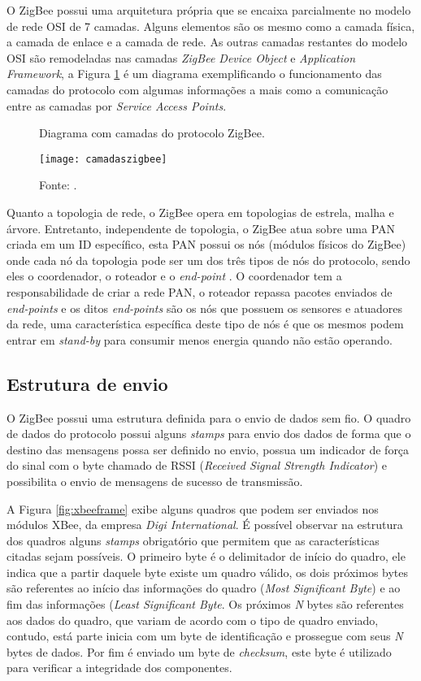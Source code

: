 O ZigBee possui uma arquitetura própria que se encaixa parcialmente no modelo de rede OSI de 7 camadas\cite{gislason2008zigbee}. Alguns elementos são os mesmo como a camada física, a camada de enlace e a camada de rede. As outras camadas restantes do modelo OSI são remodeladas nas camadas \textit{ZigBee Device Object} e \textit{Application Framework}, a Figura \ref{fig:camadaszigbee} é um diagrama exemplificando o funcionamento das camadas do protocolo com algumas informações a mais como a comunicação entre as camadas por \textit{Service Access Points}.


\begin{figure}[!htb]
	\centering
		\caption{Diagrama com camadas do protocolo ZigBee.}
		\texttt{[image: camadaszigbee]} 
		\caption*{Fonte: \cite{gislason2008zigbee}.}
		\label{fig:camadaszigbee}
\end{figure} 

Quanto a topologia de rede, o ZigBee opera em topologias de estrela, malha e árvore. Entretanto, independente de topologia, o ZigBee atua sobre uma PAN criada em um ID específico, esta PAN possui os nós (módulos físicos do ZigBee) onde cada nó da topologia pode ser um dos três tipos de nós do protocolo, sendo eles o coordenador, o roteador e o \textit{end-point} \cite{elahi2009zigbee}. O coordenador tem a responsabilidade de criar a rede PAN, o roteador repassa pacotes enviados de \textit{end-points} e os ditos \textit{end-points} são os nós que possuem os sensores e atuadores da rede, uma característica específica deste tipo de nós é que os mesmos podem entrar em \textit{stand-by} para consumir menos energia quando não estão operando.    

\subsection{Estrutura de envio}
O ZigBee possui uma estrutura definida para o envio de dados sem fio. O quadro de dados do protocolo possui alguns \textit{stamps} para envio dos dados de forma que o destino das mensagens possa ser definido no envio, possua um indicador de força do sinal com o byte chamado de RSSI (\textit{Received Signal Strength Indicator}) e possibilita o envio de mensagens de sucesso de transmissão. 

A Figura \ref{fig:xbeeframe} exibe alguns quadros que podem ser enviados nos módulos XBee, da empresa \textit{Digi International}. É possível observar na estrutura dos quadros alguns \textit{stamps} obrigatório que permitem que as características citadas sejam possíveis. O primeiro byte é o delimitador de início do quadro, ele indica que a partir daquele byte existe um quadro válido, os dois próximos bytes são referentes ao início das informações do quadro (\textit{Most Significant Byte}) e ao fim das informações (\textit{Least Significant Byte}. Os próximos \textit{N} bytes são referentes aos dados do quadro, que variam de acordo com o tipo de quadro enviado, contudo, está parte inicia com um byte de identificação e prossegue com seus \textit{N} bytes de dados. Por fim é enviado um byte de \textit{checksum}, este byte é utilizado para verificar a integridade dos componentes\cite{xbeetutorial}.       

